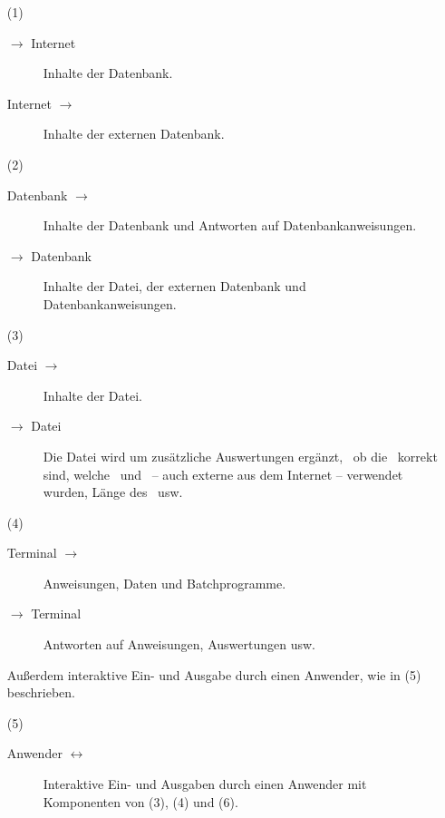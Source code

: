 \begin{itemize}
	\newcommand*{\vonnach}  [2]{#1 $\rightarrow$ #2}
	\newcommand*{\nachvon}  [2]{\vonnach{#2}{#1}}
	\newcommand*{\hinundher}[2]{#1 $\leftrightarrow$ #2}
	\item[(1)]\label{dat:Internet}
	\begin{description}
		\item[\vonnach{\ASBA}{Internet}]\label{dat:ausInternet}
		Inhalte der Datenbank.
		\item[\nachvon{\ASBA}{Internet}]\label{dat:inInternet}
		Inhalte der externen Datenbank.
	\end{description}
	\item[(2)]\label{dat:Datenbank}
	\begin{description}
		\item[\vonnach{Datenbank}{\ASBA}]\label{dat:ausDatenbank}
		Inhalte der Datenbank und Antworten auf Datenbankanweisungen.
		\item[\nachvon{Datenbank}{\ASBA}]\label{dat:inDatenbank}
		Inhalte der Datei, der externen Datenbank und Datenbankanweisungen.
	\end{description}
	\item[(3)]\label{dat:Datei}
	\begin{description}
		\item[\vonnach{Datei}{\ASBA}]\label{dat:ausDatei}
		Inhalte der Datei.
		\item[\nachvon{Datei}{\ASBA}]\label{dat:inDatei}
		Die Datei wird um zusätzliche Auswertungen ergänzt, \textzB\ ob die \Beweise\ korrekt sind, welche \Axiome\ und \Saetze\ -- auch externe aus dem Internet -- verwendet wurden, Länge des \Beweises\ usw.
	\end{description}
	\item[(4)]\label{dat:Terminal}
	\begin{description}
		\item[\vonnach{Terminal}{\ASBA}]\label{dat:ausTerminal}
		Anweisungen, Daten und Batchprogramme.
		\item[\nachvon{Terminal}{\ASBA}]\label{dat:inTerminal}
		Antworten auf Anweisungen, Auswertungen usw.
	\end{description}
	Außerdem interaktive Ein- und Ausgabe durch einen Anwender, wie in (5) beschrieben.
	\item[(5)]\label{dat:Anwender}
	\begin{description}
		\item[\hinundher{Anwender}{\ASBA}]\label{dat:mitAnwender}
		Interaktive Ein- und Ausgaben durch einen Anwender mit Komponenten von (3), (4) und (6).

\end{description}
\end{itemize}
